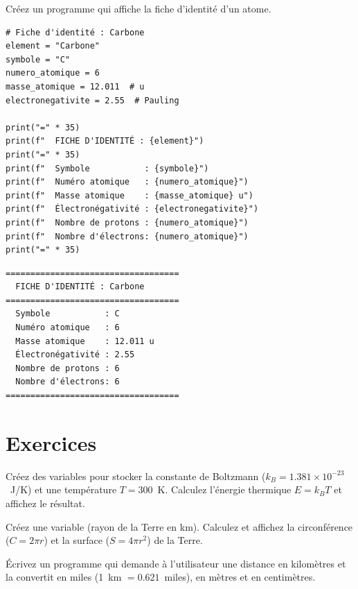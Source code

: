 \begin{projet}
Cr\'eez un programme qui affiche la fiche d'identit\'e d'un atome.

\begin{codeblock}[title=\textbf{Python}]
\begin{verbatim}
# Fiche d'identité : Carbone
element = "Carbone"
symbole = "C"
numero_atomique = 6
masse_atomique = 12.011  # u
electronegativite = 2.55  # Pauling

print("=" * 35)
print(f"  FICHE D'IDENTITÉ : {element}")
print("=" * 35)
print(f"  Symbole           : {symbole}")
print(f"  Numéro atomique   : {numero_atomique}")
print(f"  Masse atomique    : {masse_atomique} u")
print(f"  Électronégativité : {electronegativite}")
print(f"  Nombre de protons : {numero_atomique}")
print(f"  Nombre d'électrons: {numero_atomique}")
print("=" * 35)
\end{verbatim}
\end{codeblock}

\begin{codeoutput}
\begin{verbatim}
===================================
  FICHE D'IDENTITÉ : Carbone
===================================
  Symbole           : C
  Numéro atomique   : 6
  Masse atomique    : 12.011 u
  Électronégativité : 2.55
  Nombre de protons : 6
  Nombre d'électrons: 6
===================================
\end{verbatim}
\end{codeoutput}
\end{projet}

\section{Exercices}

\begin{exercice}
Cr\'eez des variables pour stocker la constante de Boltzmann ($k_B = 1.381 \times 10^{-23}$~J/K) et une temp\'erature $T = 300$~K. Calculez l'\'energie thermique $E = k_B T$ et affichez le r\'esultat.
\end{exercice}

\begin{exercice}
Cr\'eez une variable  (rayon de la Terre en km). Calculez et affichez la circonf\'erence ($C = 2\pi r$) et la surface ($S = 4\pi r^2$) de la Terre.
\end{exercice}

\begin{exercice}
\'Ecrivez un programme qui demande \`a l'utilisateur une distance en kilom\`etres et la convertit en miles (1~km $= 0.621$~miles), en m\`etres et en centim\`etres.
\end{exercice}

